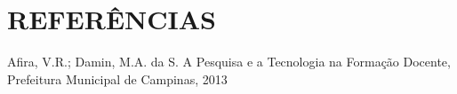 \documentclass[
12pt,		%
openright,	%
twoside,  %
a4paper,			%
chapter=TITLE,		%
english,			%
french,				%
spanish,			%
brazil				%
]{USPSC-classe/USPSC}
\begin{document}
\chapter[REFER\^ENCIAS]{REFER\^ENCIAS}\label{REFER\^ENCIAS}
\begin{flushleft}
\begin{flushleft}
\begin{flushleft}
\begin{flushleft}
\begin{flushleft}
\begin{flushleft}
\begin{flushleft}
\begin{flushleft}
\begin{flushleft}
\begin{flushleft}
\begin{flushleft}
\begin{flushleft}
\begin{flushleft}
\begin{flushleft}
\begin{flushleft}
\begin{flushleft}
\begin{flushleft}
[AFIRA, 2013] Afira, V.R.; Damin, M.A. da S. A Pesquisa e a Tecnologia na Forma\c{c}\~ao Docente, Prefeitura Municipal de Campinas, 2013
\end{flushleft}


\end{flushleft}


\end{flushleft}


\end{flushleft}


\end{flushleft}


\end{flushleft}


\end{flushleft}


\end{flushleft}


\end{flushleft}


\end{flushleft}


\end{flushleft}


\end{flushleft}


\end{flushleft}


\end{flushleft}


\end{flushleft}


\end{flushleft}


\end{flushleft}
\end{document}
